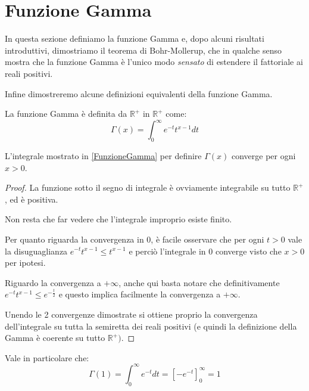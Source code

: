 \section{Funzione Gamma}
In questa sezione definiamo la funzione Gamma e, dopo alcuni risultati introduttivi, dimostriamo il teorema di Bohr-Mollerup, che
in qualche senso mostra che la funzione Gamma è l'unico modo \emph{sensato} di estendere il fattoriale ai reali positivi.

Infine dimostreremo alcune definizioni equivalenti della funzione Gamma.

\begin{definition}\label{FunzioneGamma} 
	La funzione Gamma è definita da $\mathbb{R^+}$ in $\mathbb{R^+}$ come:
	\begin{equation*}
		\Gamma(x)=\int_0^{\infty}{e^{-t}t^{x-1}dt}
	\end{equation*}
\end{definition}

\begin{lemma}\label{GammaConverge}
	L'integrale mostrato in \cref{FunzioneGamma} per definire $\Gamma(x)$ converge per ogni $x>0$.
\end{lemma}
\begin{proof}
	La funzione sotto il segno di integrale è ovviamente integrabile su tutto $\mathbb{R^+}$, ed è positiva.
	
	Non resta che far vedere che l'integrale improprio esiste finito.
	
	Per quanto riguarda la convergenza in 0, è facile osservare che per ogni $t>0$ vale la disuguaglianza $e^{-t}t^{x-1}\le t^{x-1}$ 
	e perciò l'integrale in $0$ converge visto che $x>0$ per ipotesi.
	
	Riguardo la convergenza a $+\infty$, anche qui basta notare che definitivamente $e^{-t}t^{x-1}\le e^{-\frac t2}$
	e questo implica facilmente la convergenza a $+\infty$.
	
	Unendo le 2 convergenze dimostrate si ottiene proprio la convergenza dell'integrale su tutta la semiretta dei reali positivi (e quindi la 
	definizione della Gamma è coerente su tutto $\mathbb{R^+})$.
\end{proof}


\begin{remark}\label{ValoreGamma1}
	Vale in particolare che:
	\begin{equation*}
		\Gamma(1)=\int_0^{\infty}{e^{-t}dt}=\left[-e^{-t}\right]_0^{\infty}=1
	\end{equation*}
\end{remark}


